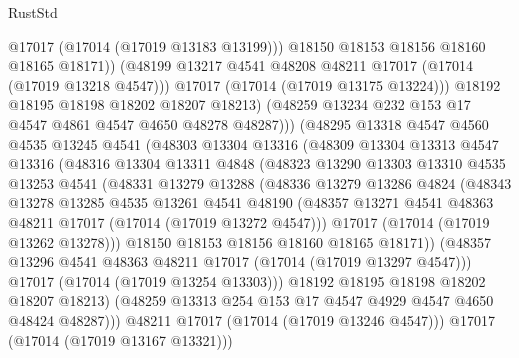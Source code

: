 \begin{lexlean}{RustStd}
\begin{coremodule}
                        @17017
                        (@17014 (@17019 @13183 @13199)))
                      @18150
                      @18153
                      @18156
                      @18160
                      @18165
                      @18171))
                  (@48199 @13217 @4541 @48208 @48211 @17017 (@17014 (@17019 @13218 @4547)))
                  @17017
                  (@17014 (@17019 @13175 @13224)))
                @18192
                @18195
                @18198
                @18202
                @18207
                @18213)
              (@48259 @13234 @232 @153 @17 @4547 @4861 @4547 @4650 @48278 @48287)))
          (@48295
            @13318
            @4547
            @4560
            @4535
            @13245
            @4541
            (@48303
              @13304
              @13316
              (@48309
                @13304
                @13313
                @4547
                @13316
                (@48316
                  @13304
                  @13311
                  @4848
                  (@48323
                    @13290
                    @13303
                    @13310
                    @4535
                    @13253
                    @4541
                    (@48331
                      @13279
                      @13288
                      (@48336
                        @13279
                        @13286
                        @4824
                        (@48343
                          @13278
                          @13285
                          @4535
                          @13261
                          @4541
                          @48190
                          (@48357 @13271 @4541 @48363 @48211 @17017 (@17014 (@17019 @13272 @4547)))
                          @17017
                          (@17014 (@17019 @13262 @13278)))
                        @18150
                        @18153
                        @18156
                        @18160
                        @18165
                        @18171))
                    (@48357 @13296 @4541 @48363 @48211 @17017 (@17014 (@17019 @13297 @4547)))
                    @17017
                    (@17014 (@17019 @13254 @13303)))
                  @18192
                  @18195
                  @18198
                  @18202
                  @18207
                  @18213)
                (@48259 @13313 @254 @153 @17 @4547 @4929 @4547 @4650 @48424 @48287)))
            @48211
            @17017
            (@17014 (@17019 @13246 @4547)))
          @17017
          (@17014 (@17019 @13167 @13321)))

\end{coremodule}
\end{lexlean}
